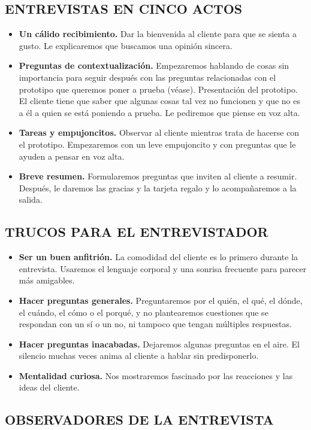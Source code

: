 \documentclass[10pt]{article}
\begin{document}
\begin{multicols}{2}
\subsection*{ENTREVISTAS EN CINCO ACTOS}
\begin{itemize}
\item \textbf{Un cálido recibimiento.} Dar la bienvenida al cliente para que se sienta a gusto. Le explicaremos que buscamos una opinión sincera.
\item \textbf{Preguntas de contextualización.} Empezaremos hablando de cosas sin importancia para seguir después con las preguntas relacionadas con el prototipo que queremos poner a prueba (véase). Presentación del prototipo. El cliente tiene que saber que algunas cosas tal vez no funcionen y que no es a él a quien se está poniendo a prueba. Le pediremos que piense en voz alta.
\item \textbf{Tareas y empujoncitos.} Observar al cliente mientras trata de hacerse con el prototipo. Empezaremos con un leve empujoncito y con preguntas que le ayuden a pensar en voz alta.
\item \textbf{Breve resumen.} Formularemos preguntas que inviten al cliente a resumir. Después, le daremos las gracias y la tarjeta regalo y lo acompañaremos a la salida.
\end{itemize}
\subsection*{TRUCOS PARA EL ENTREVISTADOR}
\begin{itemize}
\item \textbf{Ser un buen anfitrión.} La comodidad del cliente es lo primero durante la entrevista. Usaremos el lenguaje corporal y una sonrisa frecuente para parecer más amigables.
\item \textbf{Hacer preguntas generales.} Preguntaremos por el quién, el qué, el dónde, el cuándo, el cómo o el porqué, y no plantearemos
cuestiones que se respondan con un sí o un no, ni tampoco que tengan múltiples respuestas.
\item \textbf{Hacer preguntas inacabadas.} Dejaremos algunas preguntas en el aire. El silencio muchas veces anima al cliente a hablar sin predisponerlo.
\item \textbf{Mentalidad curiosa.} Nos mostraremos fascinado por las reacciones y las ideas del cliente.
\end{itemize}
\subsection*{OBSERVADORES DE LA ENTREVISTA}

\end{multicols}
\end{document}
